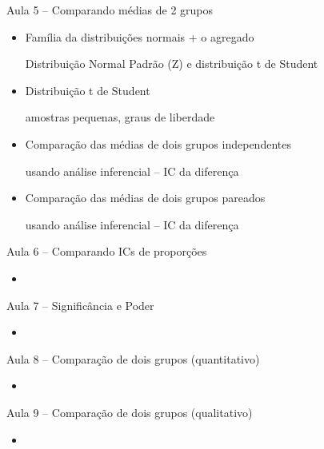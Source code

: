 \documentclass{beamer}
\begin{document}
\begin{frame}{\scriptsize Aula 5 -- Comparando médias de 2 grupos}
  \begin{itemize}
    \footnotesize
  \item Família da distribuições normais + o agregado

    {\tiny Distribuição Normal Padrão (Z) e distribuição t de Student}
    \bigskip
  \item Distribuição t de Student

    {\tiny amostras pequenas, graus de liberdade}
    \bigskip
  \item Comparação das médias de dois grupos independentes

    {\tiny usando análise inferencial -- IC da diferença}
    \bigskip
  \item Comparação das médias de dois grupos pareados

    {\tiny usando análise inferencial -- IC da diferença}
  \end{itemize}
\end{frame}

\begin{frame}{\scriptsize Aula 6 -- Comparando ICs de proporções}
  \begin{itemize}
  \item 
  \end{itemize}
\end{frame}

\begin{frame}{\scriptsize Aula 7 -- Significância e Poder}
  \begin{itemize}
  \item 
  \end{itemize}
\end{frame}

\begin{frame}{\scriptsize Aula 8 -- Comparação de dois grupos (quantitativo)}
  \begin{itemize}
  \item 
  \end{itemize}
\end{frame}

\begin{frame}{\scriptsize Aula 9 -- Comparação de dois grupos (qualitativo)}
  \begin{itemize}
  \item 
  \end{itemize}
\end{frame}
\end{document}

